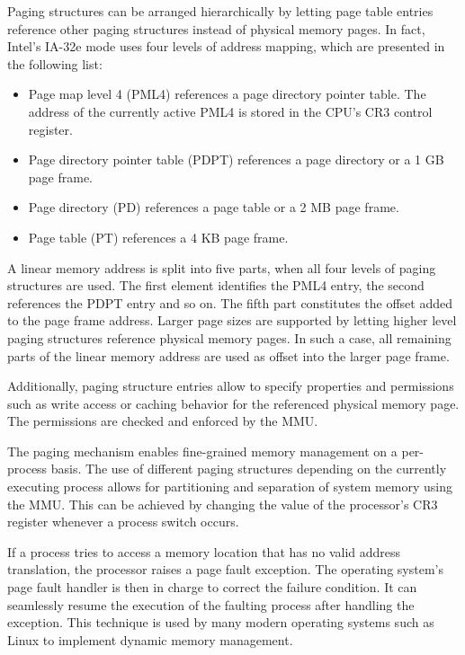 Paging structures can be arranged hierarchically by letting page table entries
reference other paging structures instead of physical memory pages. In fact,
Intel's IA-32e mode uses four levels of address mapping, which are presented in
the following list:

\begin{itemize}
	\item Page map level 4 (PML4) references a page directory
		pointer table. The address of the currently active PML4 is stored in
		the CPU's CR3 control register.
	\item Page directory pointer table (PDPT) references a page
		directory or a 1 GB page frame.
	\item Page directory (PD) references a page table or a 2 MB page
		frame.
	\item Page table (PT) references a 4 KB page frame.
\end{itemize}

A linear memory address is split into five parts, when all four levels of paging
structures are used. The first element identifies the PML4 entry, the second
references the PDPT entry and so on. The fifth part constitutes the offset added
to the page frame address. Larger page sizes are supported by letting higher
level paging structures reference physical memory pages. In such a case, all
remaining parts of the linear memory address are used as offset into the larger
page frame.

Additionally, paging structure entries allow to specify properties and
permissions such as write access or caching behavior for the referenced
physical memory page. The permissions are checked and enforced by the MMU.

The paging mechanism enables fine-grained memory management on a per-process
basis. The use of different paging structures depending on the currently
executing process allows for partitioning and separation of system memory using
the MMU. This can be achieved by changing the value of the processor's CR3
register whenever a process switch occurs.

If a process tries to access a memory location that has no valid address
translation, the processor raises a page fault exception. The operating system's
page fault handler is then in charge to correct the failure condition. It can
seamlessly resume the execution of the faulting process after handling the
exception. This technique is used by many modern operating systems such as Linux
to implement dynamic memory management.

